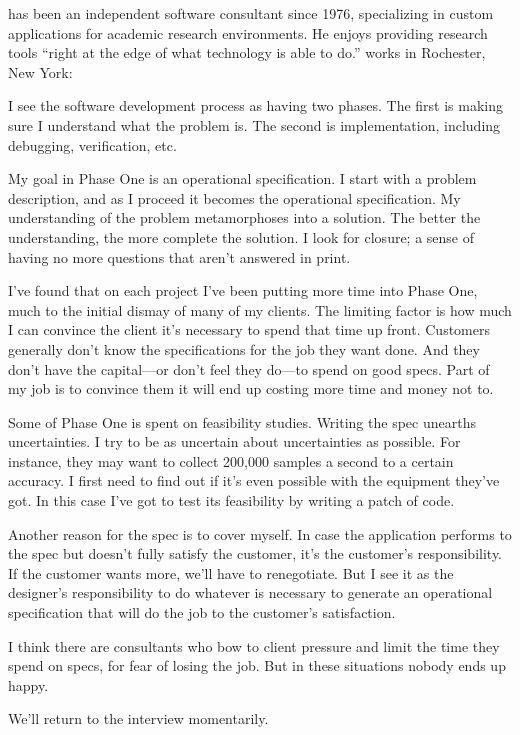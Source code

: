 \begin{interview}
\noindent {} has been an independent software consultant
since 1976, specializing in custom applications for academic research
environments.  He enjoys providing research tools ``right at the edge
of what technology is able to do.''  works in Rochester, New York:

\begin{tfquot}
I see the software development process as having two phases. The first is
making sure I understand what the problem is. The second is
implementation, including debugging, verification, etc.

My goal in Phase One is an operational specification. I start with a
problem description, and as I proceed it becomes the operational
specification. My understanding of the problem metamorphoses into a
solution. The better the understanding, the more complete the
solution. I look for closure; a sense of having no more questions that
aren't answered in print.

I've found that on each project I've been putting more time into Phase
One, much to the initial dismay of many of my clients. The limiting
factor is how
much I can convince the client it's necessary to spend that time up
front.  Customers generally don't know the specifications for the job
they want done. And they don't have the capital---or don't feel they
do---to spend on good specs. Part of my job is to convince them it
will end up costing more time and money not to.

Some of Phase One is spent on feasibility studies. Writing the spec
unearths uncertainties. I try to be as uncertain about uncertainties
as possible. For instance, they may want to collect 200,000 samples a
second to a certain accuracy. I first need to find out if it's even
possible with the equipment they've got. In this case I've got to test
its feasibility by writing a patch of code.

Another reason for the spec is to cover myself. In case the
application performs to the spec but doesn't fully satisfy the
customer, it's the customer's responsibility. If the customer wants
more, we'll have to renegotiate. But I see it as the designer's
responsibility to do whatever is necessary to generate an operational
specification that will do the job to the customer's satisfaction.

I think there are consultants who bow to client pressure and limit the
time they spend on specs, for fear of losing the job. But in these
situations nobody ends up happy.
\end{tfquot}
\end{interview}%
We'll return to the  interview momentarily.%
%

